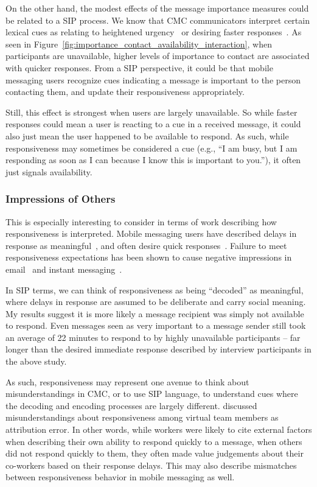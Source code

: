 \documentclass[12pt]{nuthesis}	%
\begin{document}
On the other hand, the modest effects of the message importance measures could be related to a SIP process. We know that CMC communicators interpret certain lexical cues as relating to heightened urgency~\citep{nguyen2014lexical,nguyen2016effects} or desiring faster responses~\citep{cui2016beyond}. As seen in Figure~\ref{fig:importance_contact_availability_interaction}, when participants are unavailable, higher levels of importance to contact are associated with quicker responses. From a SIP perspective, it could be that mobile messaging users recognize cues indicating a message is important to the person contacting them, and update their responsiveness appropriately.

Still, this effect is strongest when users are largely unavailable. So while faster responses could mean a user is reacting to a cue in a received message, it could also just mean the user happened to be available to respond. As such, while responsiveness may sometimes be considered a cue (e.g., ``I am busy, but I am responding as soon as I can because I know this is important to you.''), it often just signals availability.

\subsubsection{Impressions of Others}

This is especially interesting to consider in terms of work describing how responsiveness is interpreted. Mobile messaging users have described delays in response as meaningful~\citep{rettie2009mobile}, and often desire quick responses~\citep{church2013s}. Failure to meet responsiveness expectations has been shown to cause negative impressions in email~\citep{kalman2013online} and instant messaging~\citep{heston2017worth}.

In SIP terms, we can think of responsiveness as being ``decoded'' as meaningful, where delays in response are assumed to be deliberate and carry social meaning. My results suggest it is more likely a message recipient was simply not available to respond. Even messages seen as very important to a message sender still took an average of 22 minutes to respond to by highly unavailable participants -- far longer than the desired immediate response described by interview participants in the above study.

As such, responsiveness may represent one avenue to think about misunderstandings in CMC, or to use SIP language, to understand cues where the decoding and encoding processes are largely different. \citet{cramton2002attribution} discussed misunderstandings about responsiveness among virtual team members as attribution error. In other words, while workers were likely to cite external factors when describing their own ability to respond quickly to a message, when others did not respond quickly to them, they often made value judgements about their co-workers based on their response delays. This may also describe mismatches between responsiveness behavior in mobile messaging as well.
\end{document}
